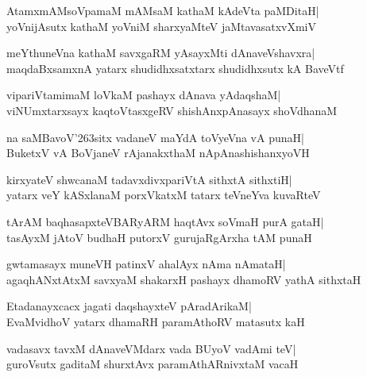 \documentclass[twoside,12pt,openright]{book}
\def\S{\char'263}
\newcounter{shloka}[chapter]
\begin{document}
\begin{shloka}%
AtamxmAMsoVpamaM mAMsaM kathaM kAdeVta paMDitaH|\\
yoVnijAsutx kathaM yoVniM sharxyaMteV jaMtavasatxvXmiV
\end{shloka}

\begin{shloka}%
meYthuneVna kathaM savxgaRM yAsayxMti dAnaveVshavxra|\\
maqdaBxsamxnA yatarx shudidhxsatxtarx shudidhxsutx kA BaveVtf
\end{shloka}

\begin{shloka}%
vipariVtamimaM loVkaM pashayx dAnava yAdaqshaM|\\
viNUmxtarxsayx kaqtoVtasxgeRV shishAnxpAnasayx shoVdhanaM
\end{shloka}

\begin{shloka}%
na saMBavoV\S sitx vadaneV maYdA toVyeVna vA punaH|\\
BuketxV vA BoVjaneV rAjanakxthaM nApAnashishanxyoVH
\end{shloka}

\begin{shloka}%
kirxyateV shwcanaM tadavxdivxpariVtA sithxtA sithxtiH|\\
yatarx veY kASxlanaM porxVkatxM tatarx teVneYva kuvaRteV
\end{shloka}

\begin{shloka}%
tArAM baqhasapxteVBARyARM haqtAvx soVmaH purA gataH|\\
tasAyxM jAtoV budhaH putorxV gurujaRgArxha tAM punaH
\end{shloka}

\begin{shloka}%
gwtamasayx muneVH patinxV ahalAyx nAma nAmataH|\\
agaqhANxtAtxM savxyaM shakarxH pashayx dhamoRV yathA sithxtaH
\end{shloka}

\begin{shloka}%
Etadanayxcacx jagati daqshayxteV pAradArikaM|\\
EvaMvidhoV yatarx dhamaRH paramAthoRV matasutx kaH
\end{shloka}

\begin{shloka}%
vadasavx tavxM dAnaveVMdarx vada BUyoV vadAmi teV|\\
guroVsutx gaditaM shurxtAvx paramAthARnivxtaM vacaH
\end{shloka}
\end{document}
